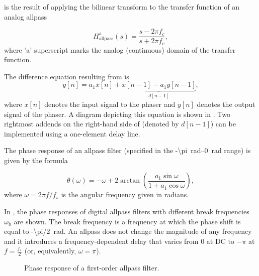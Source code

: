  is the result of applying the bilinear transform to the transfer function of an analog allpass

\begin{equation}
    H_{\text{allpass}}^{\text{a}} (s) = \frac{s - 2\pi f_c}{s + 2\pi f_c},
\end{equation}
where 'a' superscript marks the analog (continuous) domain of the transfer function.

The difference equation resulting from  is
\begin{equation}
    y[n] = a_1 x[n] + \underbrace{x[n-1] - a_1 y[n-1]}_{d[n-1]},
    \label{eq:allpass_filter_difference_equation}
\end{equation}
where $x[n]$ denotes the input signal to the phaser and $y[n]$ denotes the output signal of the phaser. A diagram depicting this equation is shown in . Two rightmost addends on the right-hand side of  (denoted by $d[n-1]$) can be implemented using a one-element delay line.


The phase response of an allpass filter (specified in the \SIrange{-\pi}{0}{rad} range) is given by the formula \cite{Kiiski2016}

\begin{equation}
    \theta (\omega) = - \omega + 2 \arctan \left( \frac{a_1 \sin \omega}{1 + a_1 \cos \omega} \right),
\end{equation}
where $\omega = 2 \pi f / f_s$ is the angular frequency given in radians.

In , the phase responses of digital allpass filters with different break frequencies $\omega_\text{b}$ are shown. The break frequency is a frequency at which the phase shift is equal to \SI{-\pi/2}{rad}. An allpass does not change the magnitude of any frequency and it introduces a frequency-dependent delay that varies from 0 at DC to $-\pi$ at $f = \frac{f_s}{2}$ (or, equivalently, $\omega = \pi$). 

\begin{figure}
    \centering
    
    \caption{Phase response of a first-order allpass filter.}
    \label{fig:phase_response_allpass_filter}
\end{figure}

